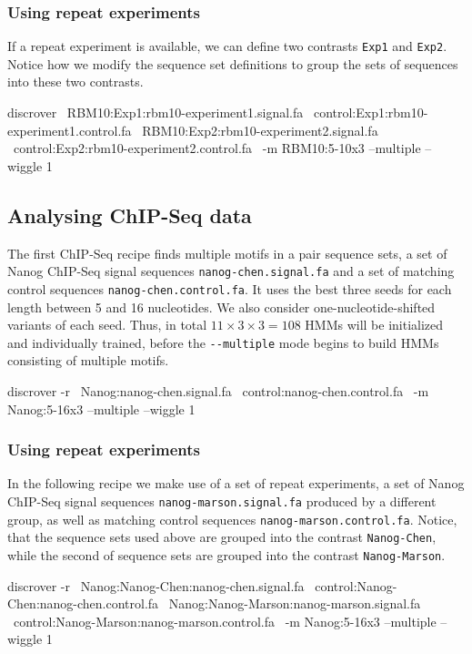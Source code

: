 \documentclass[a4paper]{article}
\begin{document}
\subsubsection{Using repeat experiments}
If a repeat experiment is available, we can define two contrasts \verb|Exp1| and \verb|Exp2|.
Notice how we modify the sequence set definitions to group the sets of sequences into these two contrasts.
\\
\begin{verbbox}
discrover \
RBM10:Exp1:rbm10-experiment1.signal.fa \
control:Exp1:rbm10-experiment1.control.fa \
RBM10:Exp2:rbm10-experiment2.signal.fa \
control:Exp2:rbm10-experiment2.control.fa \
-m RBM10:5-10x3 --multiple --wiggle 1
\end{verbbox}
\fbox{\theverbbox[t]}


\subsection{Analysing ChIP-Seq data}
The first ChIP-Seq recipe finds multiple motifs in a pair sequence sets, a set of Nanog ChIP-Seq signal sequences \verb|nanog-chen.signal.fa| and a set of matching control sequences \verb|nanog-chen.control.fa|.
It uses the best three seeds for each length between 5 and 16 nucleotides.
We also consider one-nucleotide-shifted variants of each seed.
Thus, in total $11\times3\times3=108$ HMMs will be initialized and individually trained, before the \verb|--multiple| mode begins to build HMMs consisting of multiple motifs.
\\
\begin{verbbox}
discrover -r \
Nanog:nanog-chen.signal.fa \
control:nanog-chen.control.fa \
-m Nanog:5-16x3 --multiple --wiggle 1
\end{verbbox}
\fbox{\theverbbox[t]}

\subsubsection{Using repeat experiments}
In the following recipe we make use of a set of repeat experiments, a set of Nanog ChIP-Seq signal sequences \verb|nanog-marson.signal.fa| produced by a different group, as well as matching control sequences \verb|nanog-marson.control.fa|.
Notice, that the sequence sets used above are grouped into the contrast \verb|Nanog-Chen|, while the second of sequence sets are grouped into the contrast \verb|Nanog-Marson|.
\\
\begin{verbbox}
discrover -r \
Nanog:Nanog-Chen:nanog-chen.signal.fa \
control:Nanog-Chen:nanog-chen.control.fa \
Nanog:Nanog-Marson:nanog-marson.signal.fa \
control:Nanog-Marson:nanog-marson.control.fa \
-m Nanog:5-16x3 --multiple --wiggle 1
\end{verbbox}
\fbox{\theverbbox[t]}
\end{document}
